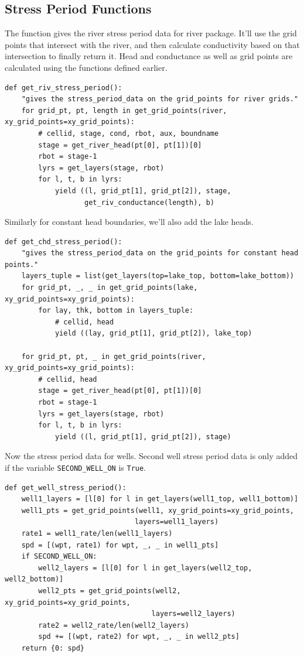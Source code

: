 \documentclass[titlepage,12pt]{unisubmission}
\begin{document}
\subsection{Stress Period Functions}
\label{sec:org9c539b3}

The function gives the river stress period data for river package. It'll use the grid points that intersect with the river, and then calculate conductivity based on that intersection to finally return it. Head and conductance as well as grid points are calculated using the functions defined earlier.

\begin{verbatim}
def get_riv_stress_period():
    "gives the stress_period_data on the grid_points for river grids."
    for grid_pt, pt, length in get_grid_points(river, xy_grid_points=xy_grid_points):
        # cellid, stage, cond, rbot, aux, boundname
        stage = get_river_head(pt[0], pt[1])[0]
        rbot = stage-1
        lyrs = get_layers(stage, rbot)
        for l, t, b in lyrs:
            yield ((l, grid_pt[1], grid_pt[2]), stage,
                   get_riv_conductance(length), b)
\end{verbatim}

Similarly for constant head boundaries, we'll also add the lake heads.

\begin{verbatim}
def get_chd_stress_period():
    "gives the stress_period_data on the grid_points for constant head points."
    layers_tuple = list(get_layers(top=lake_top, bottom=lake_bottom))
    for grid_pt, _, _ in get_grid_points(lake, xy_grid_points=xy_grid_points):
        for lay, thk, bottom in layers_tuple:
            # cellid, head
            yield ((lay, grid_pt[1], grid_pt[2]), lake_top)

    for grid_pt, pt, _ in get_grid_points(river, xy_grid_points=xy_grid_points):
        # cellid, head
        stage = get_river_head(pt[0], pt[1])[0]
        rbot = stage-1
        lyrs = get_layers(stage, rbot)
        for l, t, b in lyrs:
            yield ((l, grid_pt[1], grid_pt[2]), stage)
\end{verbatim}

Now the stress period data for wells. Second well stress period data is only added if the variable \texttt{SECOND\_WELL\_ON} is \texttt{True}.

\begin{verbatim}
def get_well_stress_period():
    well1_layers = [l[0] for l in get_layers(well1_top, well1_bottom)]
    well1_pts = get_grid_points(well1, xy_grid_points=xy_grid_points,
                               layers=well1_layers)
    rate1 = well1_rate/len(well1_layers)
    spd = [(wpt, rate1) for wpt, _, _ in well1_pts]
    if SECOND_WELL_ON:
        well2_layers = [l[0] for l in get_layers(well2_top, well2_bottom)]
        well2_pts = get_grid_points(well2, xy_grid_points=xy_grid_points,
                                   layers=well2_layers)
        rate2 = well2_rate/len(well2_layers)
        spd += [(wpt, rate2) for wpt, _, _ in well2_pts]
    return {0: spd}
\end{verbatim}
\end{document}
